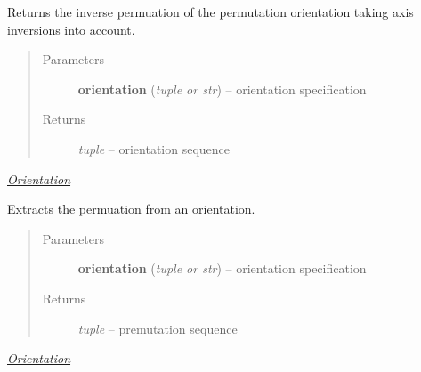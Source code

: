 \documentclass[letterpaper,10pt,english]{sphinxmanual}
\begin{document}

\begin{fulllineitems}
\label{api/ClearMap.Alignment:ClearMap.Alignment.Resampling.inverseOrientation}
Returns the inverse permuation of the permutation orientation taking axis inversions into account.
\begin{quote}\begin{description}
\item[{Parameters}] \leavevmode
\textbf{orientation} (\emph{tuple or str}) --
orientation specification

\item[{Returns}] \leavevmode
\emph{tuple} --
orientation sequence

\end{description}\end{quote}




{\hyperref[api/ClearMap.Alignment:orientation]{\emph{Orientation}}}



\end{fulllineitems}


\begin{fulllineitems}
\label{api/ClearMap.Alignment:ClearMap.Alignment.Resampling.orientationToPermuation}
Extracts the permuation from an orientation.
\begin{quote}\begin{description}
\item[{Parameters}] \leavevmode
\textbf{orientation} (\emph{tuple or str}) --
orientation specification

\item[{Returns}] \leavevmode
\emph{tuple} --
premutation sequence

\end{description}\end{quote}




{\hyperref[api/ClearMap.Alignment:orientation]{\emph{Orientation}}}



\end{fulllineitems}
\end{document}
